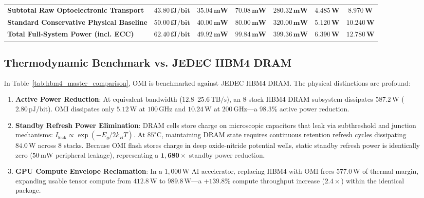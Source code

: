 \documentclass[journal]{IEEEtran}
\begin{document}
\begin{table}[!t]
{\begin{tabular}{lcccccc}
\midrule
\textbf{Subtotal Raw Optoelectronic Transport} & $\mathbf{43.80\,\text{fJ/bit}}$ & $\mathbf{35.04\,\text{mW}}$ & $\mathbf{70.08\,\text{mW}}$ & $\mathbf{280.32\,\text{mW}}$ & $\mathbf{4.485\,\text{W}}$ & $\mathbf{8.970\,\text{W}}$ \\
\textbf{Standard Conservative Physical Baseline} & $\mathbf{50.00\,\text{fJ/bit}}$ & $\mathbf{40.00\,\text{mW}}$ & $\mathbf{80.00\,\text{mW}}$ & $\mathbf{320.00\,\text{mW}}$ & $\mathbf{5.120\,\text{W}}$ & $\mathbf{10.240\,\text{W}}$ \\
\textbf{Total Full-System Power (incl. ECC)} & $\mathbf{62.40\,\text{fJ/bit}}$ & $\mathbf{49.92\,\text{mW}}$ & $\mathbf{99.84\,\text{mW}}$ & $\mathbf{399.36\,\text{mW}}$ & $\mathbf{6.390\,\text{W}}$ & $\mathbf{12.780\,\text{W}}$ \\
\bottomrule
\end{tabular}
}
\end{table}

\subsection{Thermodynamic Benchmark vs. JEDEC HBM4 DRAM}
In Table~\ref{tab:hbm4_master_comparison}, OMI is benchmarked against JEDEC HBM4 DRAM. The physical distinctions are profound:
\begin{enumerate}
    \item \textbf{Active Power Reduction}: At equivalent bandwidth ($12.8\text{--}25.6\,\text{TB/s}$), an 8-stack HBM4 DRAM subsystem dissipates $587.2\,\text{W}$ ($2.80\,\text{pJ/bit}$). OMI dissipates only $5.12\,\text{W}$ at $100\,\text{GHz}$ and $10.24\,\text{W}$ at $200\,\text{GHz}$---a $\mathbf{98.3\%}$ active power reduction.
    \item \textbf{Standby Refresh Power Elimination}: DRAM cells store charge on microscopic capacitors that leak via subthreshold and junction mechanisms: $I_{\text{leak}} \propto \exp(-E_g / 2 k_B T)$. At $85^\circ\text{C}$, maintaining DRAM state requires continuous retention refresh cycles dissipating $84.0\,\text{W}$ across 8 stacks. Because OMI flash stores charge in deep oxide-nitride potential wells, static standby refresh power is identically zero ($50\,\text{mW}$ peripheral leakage), representing a $\mathbf{1,680\times}$ standby power reduction.
    \item \textbf{GPU Compute Envelope Reclamation}: In a $1,000\,\text{W}$ AI accelerator, replacing HBM4 with OMI frees $577.0\,\text{W}$ of thermal margin, expanding usable tensor compute from $412.8\,\text{W}$ to $989.8\,\text{W}$---a $\mathbf{+139.8\%}$ compute throughput increase ($2.4\times$) within the identical package.
\end{enumerate}
\end{document}
